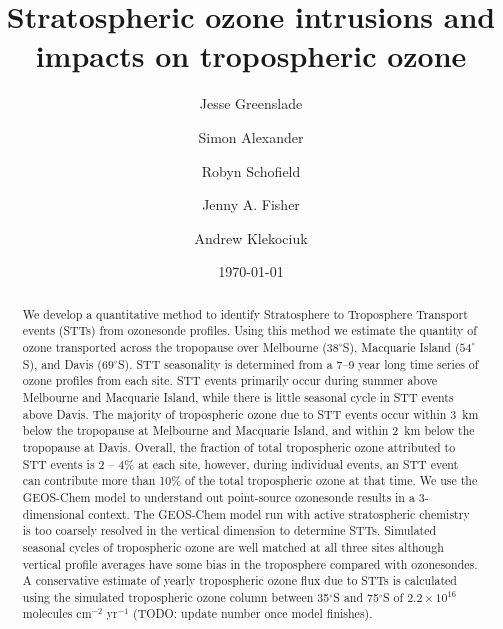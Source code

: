 \documentclass{article}
\begin{document}
\title{Stratospheric ozone intrusions and impacts on tropospheric ozone}

\author[1]{Jesse Greenslade}
\author[2]{Simon Alexander}
\author[3,4]{Robyn Schofield}
\author[1,5]{Jenny A. Fisher}
\author[2]{Andrew Klekociuk}


\date{\today}



\maketitle

\begin{abstract}
  We develop a quantitative method to identify Stratosphere to Troposphere Transport events (STTs) from ozonesonde profiles. 
  Using this method we estimate the quantity of ozone transported across the tropopause over Melbourne ($38^\circ$S), Macquarie Island ($54^\circ$S), and Davis ($69^\circ$S).
  STT seasonality is determined from a 7--9 year long time series of ozone profiles from each site.
  STT events primarily occur during summer above Melbourne and Macquarie Island, while there is little seasonal cycle in STT events above Davis.
  The majority of tropospheric ozone due to STT events occur within 3~km below the tropopause at Melbourne and Macquarie Island, and within 2~km below the tropopause at Davis.
  Overall, the fraction of total tropospheric ozone attributed to STT events is 2 – 4\% at each site, however, during individual events, an STT event can contribute more than 10\% of the total tropospheric ozone at that time.
  We use the GEOS-Chem model to understand out point-source ozonesonde results in a 3-dimensional context.
  The GEOS-Chem model run with active stratospheric chemistry is too coarsely resolved in the vertical dimension to determine STTs.
  Simulated seasonal cycles of tropospheric ozone are well matched at all three sites although vertical profile averages have some bias in the troposphere compared with ozonesondes.
  A conservative estimate of yearly tropospheric ozone flux due to STTs is calculated using the simulated tropospheric ozone column between 35$^\circ$S and  75$^\circ$S of $2.2\times10^{16}$ molecules cm$^{-2}$ yr$^{-1}$ (TODO: update number once model finishes).
  
\end{abstract}%
\end{document}
